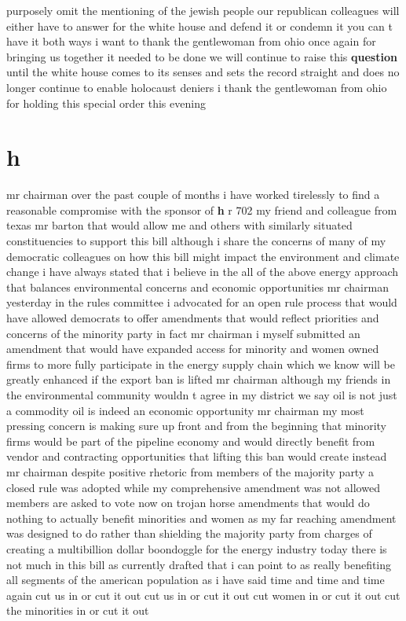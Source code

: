 \documentclass{article}
\begin{document}
purposely omit the mentioning of the jewish people our republican colleagues will either have to answer for the white house and defend it or condemn it you can t have it both ways i want to thank the gentlewoman from ohio once again for bringing us together it needed to be done we will continue to raise this {\bf \color{red} question} until the white house comes to its senses and sets the record straight and does no longer continue to enable holocaust deniers i thank the gentlewoman from ohio for holding this special order this evening\pagebreak

\section*{h}
mr chairman over the past couple of months i have worked tirelessly to find a reasonable compromise with the sponsor of {\bf \color{red} h} r 702 my friend and colleague from texas mr barton that would allow me and others with similarly situated constituencies to support this bill although i share the concerns of many of my democratic colleagues on how this bill might impact the environment and climate change i have always stated that i believe in the all of the above energy approach that balances environmental concerns and economic opportunities mr chairman yesterday in the rules committee i advocated for an open rule process that would have allowed democrats to offer amendments that would reflect priorities and concerns of the minority party in fact mr chairman i myself submitted an amendment that would have expanded access for minority and women owned firms to more fully participate in the energy supply chain which we know will be greatly enhanced if the export ban is lifted mr chairman although my friends in the environmental community wouldn t agree in my district we say oil is not just a commodity oil is indeed an economic opportunity mr chairman my most pressing concern is making sure up front and from the beginning that minority firms would be part of the pipeline economy and would directly benefit from vendor and contracting opportunities that lifting this ban would create instead mr chairman despite positive rhetoric from members of the majority party a closed rule was adopted while my comprehensive amendment was not allowed members are asked to vote now on trojan horse amendments that would do nothing to actually benefit minorities and women as my far reaching amendment was designed to do rather than shielding the majority party from charges of creating a multibillion dollar boondoggle for the energy industry today there is not much in this bill as currently drafted that i can point to as really benefiting all segments of the american population as i have said time and time and time again cut us in or cut it out cut us in or cut it out cut women in or cut it out cut the minorities in or cut it out
\end{document}
